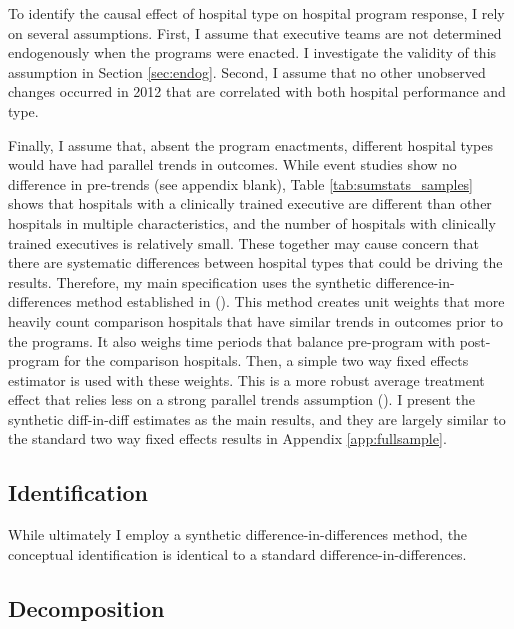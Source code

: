 \documentclass[12pt]{article}
\begin{document}
    To identify the causal effect of hospital type on hospital program response, I rely on several assumptions. First, I assume that executive teams are not determined endogenously when the programs were enacted. I investigate the validity of this assumption in Section \ref{sec:endog}. Second, I assume that no other unobserved changes occurred in 2012 that are correlated with both hospital performance and type. 
    
    Finally, I assume that, absent the program enactments, different hospital types would have had parallel trends in outcomes. While event studies show no difference in pre-trends (see appendix blank), Table \ref{tab:sumstats_samples} shows that hospitals with a clinically trained executive are different than other hospitals in multiple characteristics, and the number of hospitals with clinically trained executives is relatively small. These together may cause concern that there are systematic differences between hospital types that could be driving the results. Therefore, my main specification uses the synthetic difference-in-differences method established in \citeauthor{arkhangelsky2021synthetic} (\citeyear{arkhangelsky2021synthetic}). This method creates unit weights that more heavily count comparison hospitals that have similar trends in outcomes prior to the programs. It also weighs time periods that balance pre-program with post-program for the comparison hospitals. Then, a simple two way fixed effects estimator is used with these weights. This is a more robust average treatment effect that relies less on a strong parallel trends assumption (\cite{arkhangelsky2021synthetic}). I present the synthetic diff-in-diff estimates as the main results, and they are largely similar to the standard two way fixed effects results in Appendix \ref{app:fullsample}.

    \subsection{Identification}

    While ultimately I employ a synthetic difference-in-differences method, the conceptual identification is identical to a standard difference-in-differences.

    \subsection{Decomposition}
\end{document}
